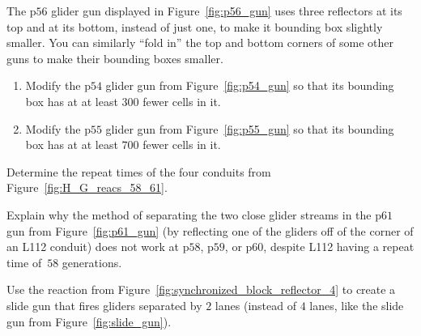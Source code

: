 \begin{multicols}{2}
	
	\mfilbreak
	
	
	\begin{problem}\label{exer:p54_fold_corners} 
		The p$56$ glider gun displayed in Figure~\ref{fig:p56_gun} uses three reflectors at its top and at its bottom, instead of just one, to make it bounding box slightly smaller. You can similarly ``fold in'' the top and bottom corners of some other guns to make their bounding boxes smaller.
		
		\begin{enumerate}[label=\bf\color{ocre}(\alph*)]
			\item Modify the p$54$ glider gun from Figure~\ref{fig:p54_gun} so that its bounding box has at at least $300$ fewer cells in it.
			
			\item Modify the p$55$ glider gun from Figure~\ref{fig:p55_gun} so that its bounding box has at at least $700$ fewer cells in it.
		\end{enumerate}
	\end{problem}
	
	
	\mfilbreak
	
	
	\begin{problem}\label{exer:H_G_reacs_58_61} 
		Determine the repeat times of the four conduits from Figure~\ref{fig:H_G_reacs_58_61}.
	\end{problem}
	
	
	\mfilbreak
	
	
	\begin{problem}\label{exer:p61_gun_reflection_no_60} 
		Explain why the method of separating the two close glider streams in the p$61$ gun from Figure~\ref{fig:p61_gun} (by reflecting one of the gliders off of the corner of an L112 conduit) does not work at p$58$, p$59$, or p$60$, despite L112 having a repeat time of~$58$ generations.
	\end{problem}
	
	
	\mfilbreak
	
	
	\begin{problem}\label{exer:2_lane_slide_gun} 
		Use the reaction from Figure~\ref{fig:synchronized_block_reflector_4} to create a slide gun that fires gliders separated by $2$ lanes (instead of $4$ lanes, like the slide gun from Figure~\ref{fig:slide_gun}).
	\end{problem}
	

\end{multicols}
